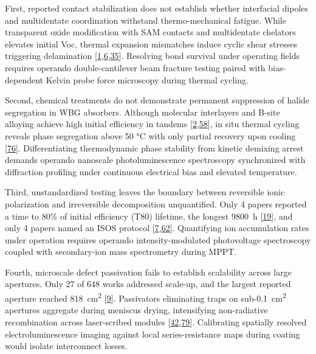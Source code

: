 \documentclass[
  11pt,
]{article}
\begin{document}
First, reported contact stabilization does not establish whether
interfacial dipoles and multidentate coordination withstand
thermo-mechanical fatigue. While transparent oxide modification with SAM
contacts and multidentate chelators elevates initial Voc, thermal
expansion mismatches induce cyclic shear stresses triggering
delamination
{[}\href{https://doi.org/10.1126/sciadv.aei2945}{1},\href{https://doi.org/10.1002/adma.73807}{6},\href{https://doi.org/10.1021/acsenergylett.6c01489}{35}{]}.
Resolving bond survival under operating fields requires operando
double-cantilever beam fracture testing paired with bias-dependent
Kelvin probe force microscopy during thermal cycling.

Second, chemical treatments do not demonstrate permanent suppression of
halide segregation in WBG absorbers. Although molecular interlayers and
B-site alloying achieve high initial efficiency in tandems
{[}\href{https://doi.org/10.1002/anie.1676645}{2},\href{https://doi.org/10.1002/aenm.71317}{58}{]},
in situ thermal cycling reveals phase segregation above 50 °C with only
partial recovery upon cooling
{[}\href{https://doi.org/10.1021/acsenergylett.6c00992}{76}{]}.
Differentiating thermodynamic phase stability from kinetic demixing
arrest demands operando nanoscale photoluminescence spectroscopy
synchronized with diffraction profiling under continuous electrical bias
and elevated temperature.

Third, unstandardized testing leaves the boundary between reversible
ionic polarization and irreversible decomposition unquantified. Only 4
papers reported a time to 80\% of initial efficiency (T80) lifetime, the
longest \qty{9800}{\hour}
{[}\href{https://doi.org/10.1002/adma.74243}{19}{]}, and only 4 papers
named an ISOS protocol
{[}\href{https://doi.org/10.1126/sciadv.aeg1456}{7},\href{https://doi.org/10.1021/acsenergylett.6c01517}{62}{]}.
Quantifying ion accumulation rates under operation requires operando
intensity-modulated photovoltage spectroscopy coupled with secondary-ion
mass spectrometry during MPPT.

Fourth, microscale defect passivation fails to establish scalability
across large apertures. Only 27 of 648 works addressed scale-up, and the
largest reported aperture reached \qty{818}{\centi\meter\squared}
{[}\href{https://doi.org/10.1021/jacs.6c06932}{9}{]}. Passivators
eliminating traps on sub-\qty{0.1}{\centi\meter\squared} apertures
aggregate during meniscus drying, intensifying non-radiative
recombination across laser-scribed modules
{[}\href{https://doi.org/10.1126/sciadv.aed6327}{42},\href{https://doi.org/10.1002/solr.70375}{79}{]}.
Calibrating spatially resolved electroluminescence imaging against local
series-resistance maps during coating would isolate interconnect losses.
\end{document}
